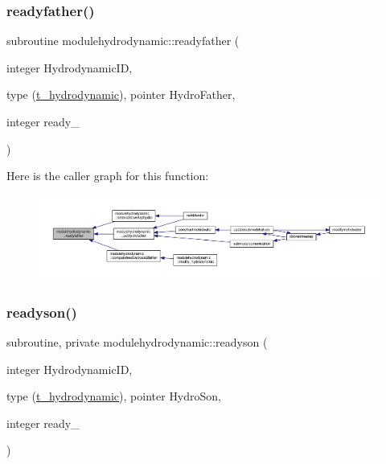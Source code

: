 \subsubsection{\texorpdfstring{readyfather()}{readyfather()}}
{\footnotesize\ttfamily subroutine modulehydrodynamic\+::readyfather (\begin{DoxyParamCaption}\item[{integer}]{Hydrodynamic\+ID,  }\item[{type (\mbox{\hyperlink{structmodulehydrodynamic_1_1t__hydrodynamic}{t\+\_\+hydrodynamic}}), pointer}]{Hydro\+Father,  }\item[{integer}]{ready\+\_\+ }\end{DoxyParamCaption})\hspace{0.3cm}{\ttfamily [private]}}

Here is the caller graph for this function\+:\nopagebreak
\begin{figure}[H]
\begin{center}
\leavevmode
\includegraphics[width=350pt]{namespacemodulehydrodynamic_a3590684b189672df14d8ed25dc6e6156_icgraph}
\end{center}
\end{figure}
\mbox{\label{namespacemodulehydrodynamic_a89980d9805db3770c7583bdefe7730fa}} 
\subsubsection{\texorpdfstring{readyson()}{readyson()}}
{\footnotesize\ttfamily subroutine, private modulehydrodynamic\+::readyson (\begin{DoxyParamCaption}\item[{integer}]{Hydrodynamic\+ID,  }\item[{type (\mbox{\hyperlink{structmodulehydrodynamic_1_1t__hydrodynamic}{t\+\_\+hydrodynamic}}), pointer}]{Hydro\+Son,  }\item[{integer}]{ready\+\_\+ }\end{DoxyParamCaption})\hspace{0.3cm}{\ttfamily [private]}}

